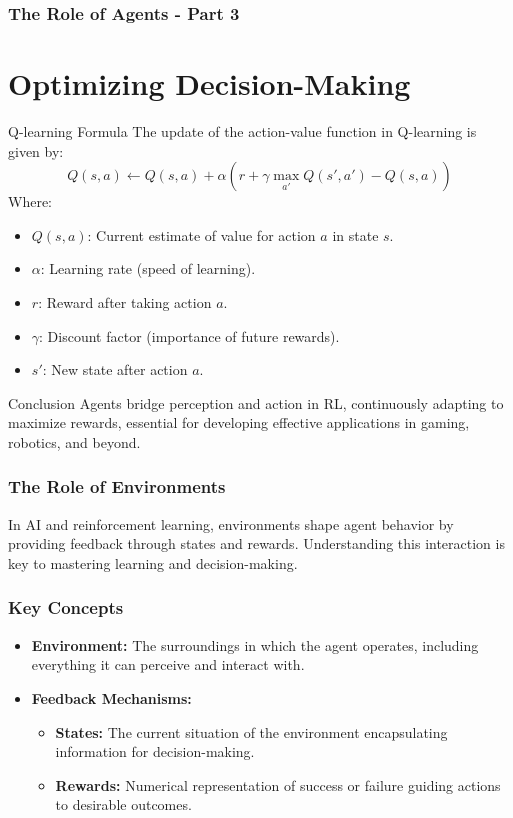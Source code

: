 \documentclass[aspectratio=169]{beamer}
\begin{document}
\begin{frame}[fragile]
    \frametitle{The Role of Agents - Part 3}
    \section{Optimizing Decision-Making}

    \begin{block}{Q-learning Formula}
    The update of the action-value function in Q-learning is given by:
    \begin{equation}
        Q(s, a) \gets Q(s, a) + \alpha \left( r + \gamma \max_{a'} Q(s', a') - Q(s, a) \right)
    \end{equation}
    Where:
    \begin{itemize}
        \item \( Q(s, a) \): Current estimate of value for action \( a \) in state \( s \).
        \item \( \alpha \): Learning rate (speed of learning).
        \item \( r \): Reward after taking action \( a \).
        \item \( \gamma \): Discount factor (importance of future rewards).
        \item \( s' \): New state after action \( a \).
    \end{itemize}
    \end{block}

    \begin{block}{Conclusion}
        Agents bridge perception and action in RL, continuously adapting to maximize rewards, essential for developing effective applications in gaming, robotics, and beyond.
    \end{block}
\end{frame}

\begin{frame}
    \frametitle{The Role of Environments}
    In AI and reinforcement learning, environments shape agent behavior by providing feedback through states and rewards. Understanding this interaction is key to mastering learning and decision-making.
\end{frame}

\begin{frame}
    \frametitle{Key Concepts}
    \begin{itemize}
        \item \textbf{Environment:} The surroundings in which the agent operates, including everything it can perceive and interact with.
        \item \textbf{Feedback Mechanisms:}
        \begin{itemize}
            \item \textbf{States:} The current situation of the environment encapsulating information for decision-making.
            \item \textbf{Rewards:} Numerical representation of success or failure guiding actions to desirable outcomes.
        \end{itemize}
    \end{itemize}
\end{frame}
\end{document}
